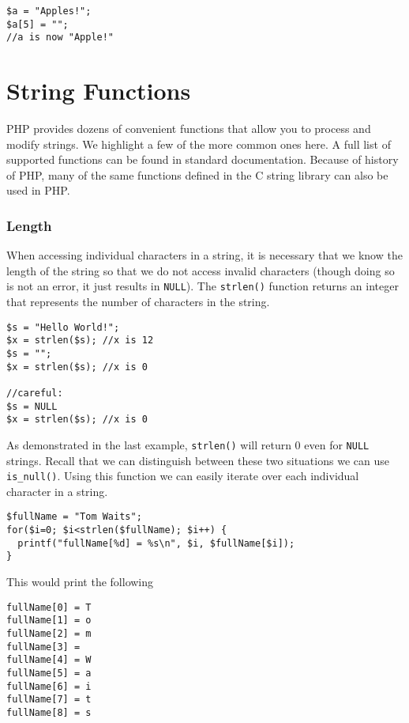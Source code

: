 \begin{verbatim}
$a = "Apples!";
$a[5] = "";
//a is now "Apple!"
\end{verbatim}

\section{String Functions}

PHP provides dozens of convenient functions that allow 
you to process and modify strings.  We highlight a few 
of the more common ones here.  A full list of supported 
functions can be found in standard documentation.  Because
of history of PHP, many of the same functions defined in
the C string library can also be used in PHP.

\subsubsection{Length}

When accessing individual characters in a string, it
is necessary that we know the length of the string so
that we do not access invalid characters (though doing
so is not an error, it just results in \texttt{NULL}).
The \texttt{strlen()} function returns an
integer that represents the number of characters in the
string.  

\begin{verbatim}
$s = "Hello World!";
$x = strlen($s); //x is 12
$s = "";
$x = strlen($s); //x is 0

//careful:
$s = NULL
$x = strlen($s); //x is 0
\end{verbatim}

As demonstrated in the last example, \texttt{strlen()}
will return 0 even for \texttt{NULL} strings.
Recall that we can distinguish between these two situations
we can use \texttt{is_null()}.  Using this function
we can easily iterate over each individual character in a string.

\begin{verbatim}
$fullName = "Tom Waits";
for($i=0; $i<strlen($fullName); $i++) {
  printf("fullName[%d] = %s\n", $i, $fullName[$i]);
}
\end{verbatim}

This would print the following

\begin{verbatim}
fullName[0] = T
fullName[1] = o
fullName[2] = m
fullName[3] =  
fullName[4] = W
fullName[5] = a
fullName[6] = i
fullName[7] = t
fullName[8] = s
\end{verbatim}

